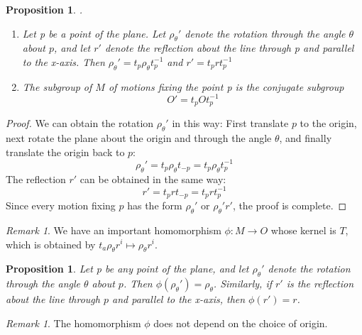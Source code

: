 \documentclass[12pt]{article}
\newtheorem{prop}[thm]{Proposition}
\theoremstyle{definition}
\theoremstyle{remark}
\newtheorem{rmk}[thm]{Remark}
\numberwithin{equation}{section}
\begin{document}
\begin{prop}
        .\newline \begin{enumerate}
                \item Let p be a point of the plane. Let $\rho_{\theta}'$ denote the rotation through the angle $\theta$ about $p$, and let $r'$ denote the reflection about the line through p and parallel to the x-axis. Then $\rho_{\theta}' = t_p\rho_{\theta}t_p^{-1}$ and $r' = t_prt_p^{-1}$
                \item The subgroup of $M$ of motions fixing the point p is the conjugate subgroup \begin{equation}
                                O' = t_pOt_p^{-1}
                \end{equation}
        \end{enumerate}
\end{prop}
\begin{proof}
        We can obtain the rotation $\rho_{\theta}'$ in this way: First translate $p$ to the origin, next rotate the plane about the origin and through the angle $\theta$, and finally translate the origin back to $p$: \begin{equation}
                \rho_{\theta}' =t_p\rho_{\theta}t_{-p} = t_p\rho_{\theta}t_p^{-1}
        \end{equation}
        The reflection $r'$ can be obtained in the same way: \begin{equation}
                r' = t_prt_{-p} = t_prt_p^{-1}
        \end{equation}
        Since every motion fixing $p$ has the form $\rho_{\theta}'$ or $\rho_{\theta}'r'$, the proof is complete.
\end{proof}


\vspace{15pt}

\begin{rmk}
        We have an important homomorphism $\phi:M\rightarrow O$ whose kernel is $T$, which is obtained by $t_a\rho_{\theta}r^i \mapsto \rho_{\theta}r^i$.
\end{rmk}

\vspace{15pt}

\begin{prop}
        Let p be any point of the plane, and let $\rho_{\theta}'$ denote the rotation through the angle $\theta$ about $p$. Then $\phi(\rho_{\theta}') = \rho_{\theta}$. Similarly, if $r'$ is the reflection about the line through $p$ and parallel to the x-axis, then $\phi(r') = r$.
\end{prop}
\begin{rmk}
        The homomorphism $\phi$ does not depend on the choice of origin.
\end{rmk}
\end{document}
